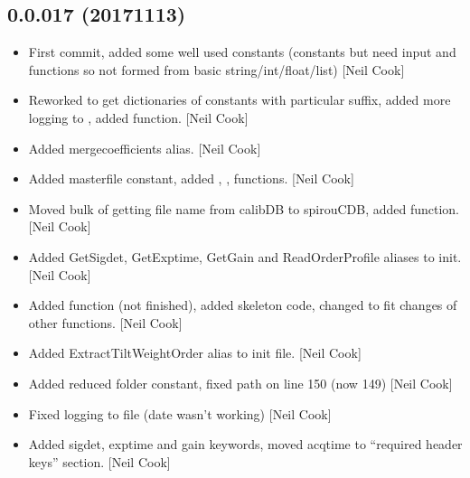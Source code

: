 \documentclass[a4paper,10pt,english]{report}
\begin{document}
\subsection{0.0.017 (2017\sphinxhyphen{}11\sphinxhyphen{}13)}
\label{\detokenize{misc/changelog:id553}}\begin{itemize}
\item {} 
First commit, added some well used constants (constants but need input
and functions so not formed from basic string/int/float/list) {[}Neil
Cook{]}

\item {} 
Reworked  to get dictionaries of constants with particular
suffix, added more logging to , added
 function. {[}Neil Cook{]}

\item {} 
Added mergecoefficients alias. {[}Neil Cook{]}

\item {} 
Added masterfile constant, added , , 
functions. {[}Neil Cook{]}

\item {} 
Moved bulk of getting file name from calibDB to spirouCDB, added
 function. {[}Neil Cook{]}

\item {} 
Added GetSigdet, GetExptime, GetGain and ReadOrderProfile aliases to
init. {[}Neil Cook{]}

\item {} 
Added  function (not finished), added
 skeleton code, changed  to fit
changes of other functions. {[}Neil Cook{]}

\item {} 
Added ExtractTiltWeightOrder alias to init file. {[}Neil Cook{]}

\item {} 
Added reduced folder constant, fixed  path on line 150 (now
149) {[}Neil Cook{]}

\item {} 
Fixed logging to file (date wasn’t working) {[}Neil Cook{]}

\item {} 
Added sigdet, exptime and gain keywords, moved acqtime to “required
header keys” section. {[}Neil Cook{]}


\end{itemize}
\end{document}

